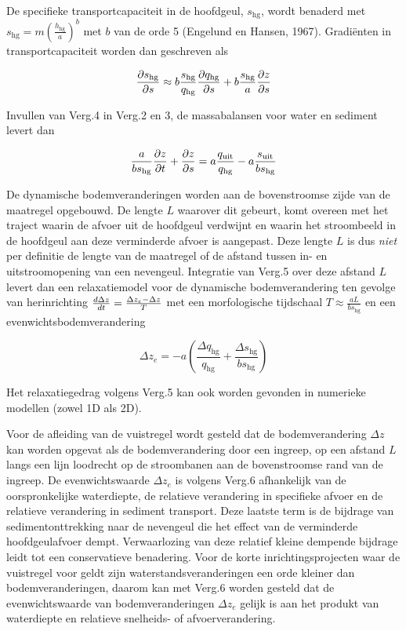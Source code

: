 De specifieke transportcapaciteit in de hoofdgeul, $s_\text{hg}$, wordt benaderd met $s_\text{hg} = m \left ( \frac{h_\text{hg}}{a} \right )^b$ met $b$ van de orde 5 (Engelund en Hansen, 1967).
Gradi\"enten in transportcapaciteit worden dan geschreven als

\begin{equation}
\pdiff{s_\text{hg}}{s} \approx b \frac{s_\text{hg}}{q_\text{hg}} \pdiff{q_\text{hg}}{s} + b \frac{s_\text{hg}}{a} \pdiff{z}{s}
\end{equation}

Invullen van Verg.4 in Verg.2 en 3, de massabalansen voor water en sediment levert dan

\begin{equation}
\frac{a}{b s_\text{hg}} \pdiff{z}{t} + \pdiff{z}{s} = a \frac{q_\text{uit}}{q_\text{hg}} - a \frac{s_\text{uit}}{b s_\text{hg}}
\end{equation}

De dynamische bodemveranderingen worden aan de bovenstroomse zijde van de maatregel opgebouwd.
De lengte $L$ waarover dit gebeurt, komt overeen met het traject waarin de afvoer uit de hoofdgeul verdwijnt en waarin het stroombeeld in de hoofdgeul aan deze verminderde afvoer is aangepast.
Deze lengte $L$ is dus \emph{niet} per definitie de lengte van de maatregel of de afstand tussen in- en uitstroomopening van een
nevengeul.
Integratie van Verg.5 over deze afstand $L$ levert dan een relaxatiemodel voor de dynamische bodemverandering ten gevolge van herinrichting $\diff{\Delta z}{t} = \frac{\Delta z_e - \Delta z}{T}$ met een morfologische tijdschaal $T \approx \frac{a L}{bs_\text{hg}}$ en een evenwichtsbodemverandering

\begin{equation}
\Delta z_e = -a \left ( \frac{\Delta q_\text{hg}}{q_\text{hg}} + \frac{\Delta s_\text{hg}}{b s_\text{hg}} \right )
\end{equation}

Het relaxatiegedrag volgens Verg.5 kan ook worden gevonden in numerieke modellen (zowel 1D als 2D).

Voor de afleiding van de vuistregel wordt gesteld dat de bodemverandering $\Delta z$ kan worden opgevat als de bodemverandering door een ingreep, op een afstand $L$ langs een lijn loodrecht op de stroombanen aan de bovenstroomse rand van de ingreep.
De evenwichtswaarde $\Delta z_e$ is volgens Verg.6 afhankelijk van de oorspronkelijke waterdiepte, de relatieve verandering in specifieke afvoer en de relatieve verandering in sediment transport.
Deze laatste term is de bijdrage van sedimentonttrekking naar de nevengeul die het effect van de verminderde hoofdgeulafvoer dempt.
Verwaarlozing van deze relatief kleine dempende bijdrage leidt tot een conservatieve benadering.
Voor de korte inrichtingsprojecten waar de vuistregel voor geldt zijn waterstandsveranderingen een orde kleiner dan bodemveranderingen, daarom kan met Verg.6 worden gesteld dat de evenwichtswaarde van bodemveranderingen $\Delta z_e$ gelijk is aan het produkt van waterdiepte en relatieve snelheids- of afvoerverandering.

